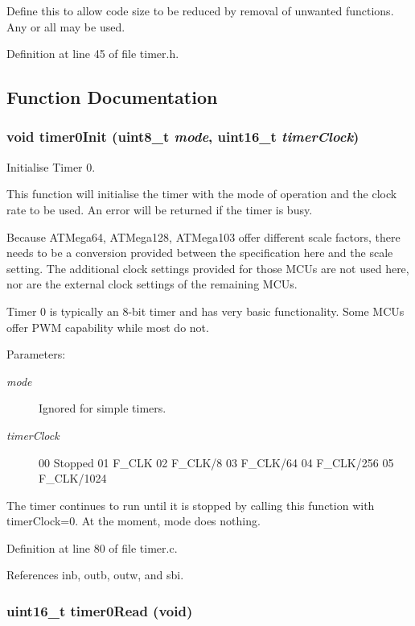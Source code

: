 Define this to allow code size to be reduced by removal of unwanted functions. Any or all may be used. 

Definition at line 45 of file timer.h.

\subsection{Function Documentation}
\subsubsection{\setlength{\rightskip}{0pt plus 5cm}void timer0Init (uint8\_\-t {\em mode}, uint16\_\-t {\em timerClock})}\label{timer_8h_b92fc98e45a0adae9832e4e037f79b41}


Initialise Timer 0. 

This function will initialise the timer with the mode of operation and the clock rate to be used. An error will be returned if the timer is busy.

Because ATMega64, ATMega128, ATMega103 offer different scale factors, there needs to be a conversion provided between the specification here and the scale setting. The additional clock settings provided for those MCUs are not used here, nor are the external clock settings of the remaining MCUs.

Timer 0 is typically an 8-bit timer and has very basic functionality. Some MCUs offer PWM capability while most do not.

\begin{Desc}
\item[Parameters:]
\begin{description}
\item[{\em mode}]Ignored for simple timers. \item[{\em timerClock}]00 Stopped 01 F\_\-CLK 02 F\_\-CLK/8 03 F\_\-CLK/64 04 F\_\-CLK/256 05 F\_\-CLK/1024\end{description}
\end{Desc}
The timer continues to run until it is stopped by calling this function with timerClock=0. At the moment, mode does nothing. 

Definition at line 80 of file timer.c.

References inb, outb, outw, and sbi.
\subsubsection{\setlength{\rightskip}{0pt plus 5cm}uint16\_\-t timer0Read (void)}\label{timer_8h_7cf9215ace167364e5b1b2af46b0272d}



